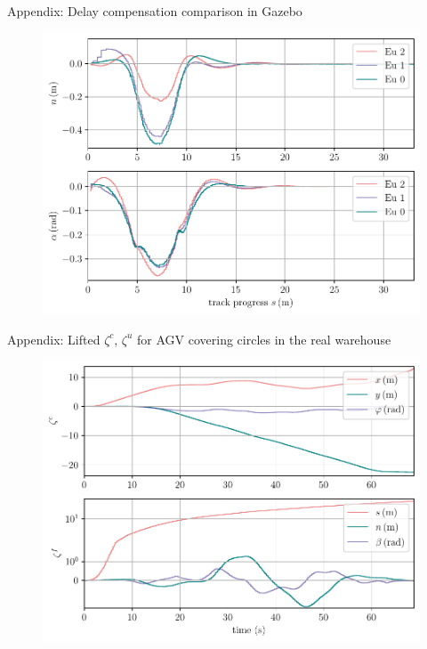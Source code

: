 \documentclass[10pt,aspectratio=1610]{beamer} %
\begin{document}

\begin{frame}{Appendix: Delay compensation comparison in Gazebo}
	\begin{figure}[h!tbp]
		\includegraphics[scale=0.65]{figures/predictor}
	\end{figure}
\end{frame}

\begin{frame}{Appendix: Lifted $\zeta^{c}$, $\zeta^{u}$ for AGV covering circles in the real warehouse}
	\begin{figure}[h!tbp]
		\includegraphics[scale=0.65]{figures/zeta_time}
	\end{figure}
\end{frame}
\end{document}
